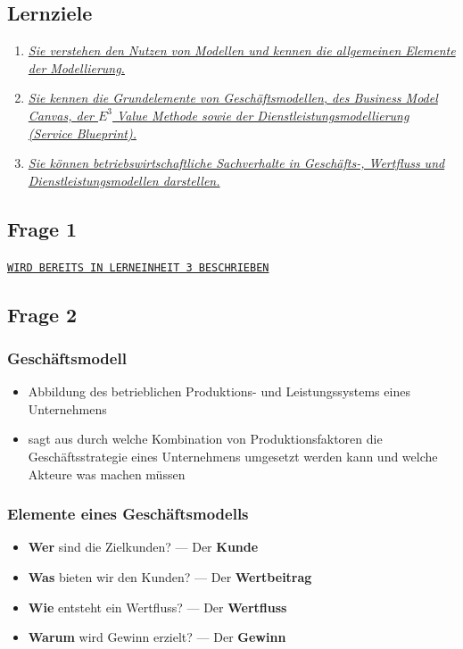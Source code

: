 \documentclass[a4paper]{article}
\begin{document}
			\subsection{Lernziele}
			\begin{enumerate}
				\item \hyperref[le5-1]{\textit{Sie verstehen den Nutzen von Modellen und kennen die allgemeinen Elemente der Modellierung.}}
				\item \hyperref[le5-2]{\textit{Sie kennen die Grundelemente von Geschäftsmodellen, des Business Model Canvas, der $E^3$ Value Methode sowie der Dienstleistungsmodellierung (Service Blueprint).}}
				\item \hyperref[le5-3]{\textit{Sie können betriebswirtschaftliche Sachverhalte in Geschäfts-, Wertfluss und Dienstleistungsmodellen darstellen.}}
			\end{enumerate}
			
			\subsection{Frage 1}
			\label{le5-1}
			\texttt{\hyperref[redir5-1--3-1]{WIRD BEREITS IN LERNEINHEIT 3 BESCHRIEBEN}}
			
			\subsection{Frage 2}
			\label{le5-2}
			\subsubsection{Geschäftsmodell}
			\begin{itemize}
				\item Abbildung des betrieblichen Produktions- und Leistungssystems eines Unternehmens
				\item sagt aus durch welche Kombination von Produktionsfaktoren die Geschäftsstrategie eines Unternehmens umgesetzt werden kann und welche Akteure was machen müssen
			\end{itemize}
			
			
			
			\subsubsection{Elemente eines Geschäftsmodells}
			\begin{itemize}
				\item \textbf{Wer} sind die Zielkunden? --- Der \textbf{Kunde}
				\item \textbf{Was} bieten wir den Kunden? --- Der \textbf{Wertbeitrag}
				\item \textbf{Wie} entsteht ein Wertfluss? --- Der \textbf{Wertfluss}
				\item \textbf{Warum} wird Gewinn erzielt? --- Der \textbf{Gewinn}
			\end{itemize}
			
\end{document}
